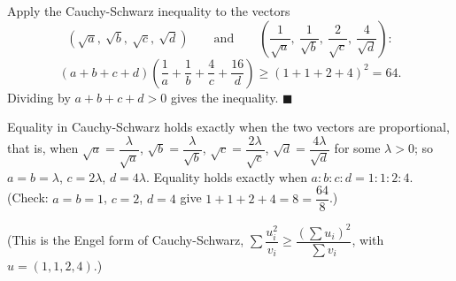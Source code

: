 Apply the Cauchy-Schwarz inequality to the vectors
\[\left(\sqrt a,\ \sqrt b,\ \sqrt c,\ \sqrt d\right)\qquad\text{and}\qquad\left(\dfrac{1}{\sqrt a},\ \dfrac{1}{\sqrt b},\ \dfrac{2}{\sqrt c},\ \dfrac{4}{\sqrt d}\right):\]
\[(a+b+c+d)\left(\dfrac{1}{a}+\dfrac{1}{b}+\dfrac{4}{c}+\dfrac{16}{d}\right)\ge\left(1+1+2+4\right)^2=64 .\]
Dividing by $a+b+c+d>0$ gives the inequality. $\blacksquare$

Equality in Cauchy-Schwarz holds exactly when the two vectors are proportional, that is, when $\sqrt a=\dfrac{\lambda}{\sqrt a}$, $\sqrt b=\dfrac{\lambda}{\sqrt b}$, $\sqrt c=\dfrac{2\lambda}{\sqrt c}$, $\sqrt d=\dfrac{4\lambda}{\sqrt d}$ for some $\lambda>0$; so $a=b=\lambda$, $c=2\lambda$, $d=4\lambda$. Equality holds exactly when $\boxed{a:b:c:d=1:1:2:4}$. (Check: $a=b=1$, $c=2$, $d=4$ give $1+1+2+4=8=\dfrac{64}{8}$.)

(This is the Engel form of Cauchy-Schwarz, $\sum\dfrac{u_i^2}{v_i}\ge\dfrac{\left(\sum u_i\right)^2}{\sum v_i}$, with $u=(1,1,2,4)$.)
